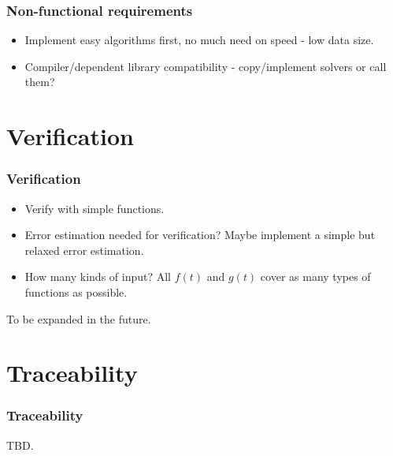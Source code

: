 \documentclass{beamer}
\begin{document}
	\begin{frame}
		\frametitle{Non-functional requirements}
		\begin{itemize}
			\item Implement easy algorithms first, no much need on speed - low data size.
			\item Compiler/dependent library compatibility - copy/implement solvers or call them?
		\end{itemize}
	\end{frame}
	
	\section{Verification}
	\begin{frame}
		\frametitle{Verification}
		\begin{itemize}
			\item Verify with simple functions.
			\item Error estimation needed for verification? Maybe implement a simple but relaxed error estimation.
			\item How many kinds of input? All $f(t)$ and $g(t)$ cover as many types of functions as possible.
		\end{itemize}
		To be expanded in the future.
	\end{frame}
	
	\section{Traceability}
	\begin{frame}
		\frametitle{Traceability}
		TBD.
	\end{frame}
\end{document}
